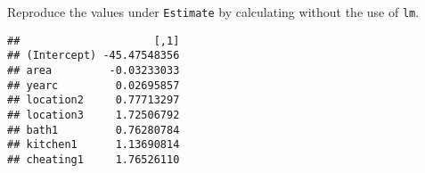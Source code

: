 \documentclass[ignorenonframetext,]{beamer}
\newenvironment{Shaded}{\begin{snugshade}}{\end{snugshade}}
\newcommand{\KeywordTok}[1]{\textcolor[rgb]{0.13,0.29,0.53}{\textbf{#1}}}
\newcommand{\DataTypeTok}[1]{\textcolor[rgb]{0.13,0.29,0.53}{#1}}
\newcommand{\StringTok}[1]{\textcolor[rgb]{0.31,0.60,0.02}{#1}}
\newcommand{\OperatorTok}[1]{\textcolor[rgb]{0.81,0.36,0.00}{\textbf{#1}}}
\newcommand{\NormalTok}[1]{#1}
\begin{document}
\begin{frame}[fragile]

Reproduce the values under \texttt{Estimate} by calculating without the
use of \texttt{lm}.

\begin{Shaded}
\end{Shaded}

\begin{verbatim}
##                     [,1]
## (Intercept) -45.47548356
## area         -0.03233033
## yearc         0.02695857
## location2     0.77713297
## location3     1.72506792
## bath1         0.76280784
## kitchen1      1.13690814
## cheating1     1.76526110
\end{verbatim}

\end{frame}
\end{document}
